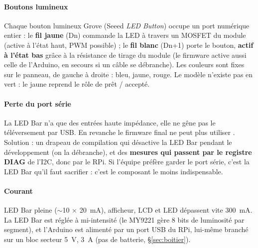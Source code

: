 \documentclass[11pt,a4paper]{article}
\newcommand{\code}[1]{\texttt{\detokenize{#1}}}
\newcommand{\env}{\mbox{$\sim$}}
\begin{document}
\paragraph{Boutons lumineux} Chaque bouton lumineux Grove (Seeed \emph{LED Button}) occupe un port numérique entier : le \textbf{fil jaune} (Dn) commande la LED à travers un MOSFET du module (active à l'état haut, PWM possible) ; le \textbf{fil blanc} (Dn+1) porte le bouton, \textbf{actif à l'état bas} grâce à la résistance de tirage du module (le firmware active aussi celle de l'Arduino, en secours si un câble se débranche). Les couleurs sont fixes sur le panneau, de gauche à droite : bleu, jaune, rouge. Le modèle n'existe pas en vert : le jaune reprend le rôle de \og prêt / accepté\fg{}.

\paragraph{Perte du port série} La LED Bar n'a que des entrées haute impédance, elle ne gêne pas le téléversement par USB. En revanche le firmware final ne peut plus utiliser \code{Serial}. Solution : un drapeau de compilation \code{DEBUG_SERIAL} qui désactive la LED Bar pendant le développement (on la débranche), et des \textbf{mesures qui passent par le registre DIAG} de l'I2C, donc par le RPi. Si l'équipe préfère garder le port série, c'est la LED Bar qu'il faut sacrifier : c'est le composant le moins indispensable.

\paragraph{Courant} LED Bar pleine (\env 10 × 20~mA), afficheur, LCD et LED dépassent vite 300~mA. La LED Bar est réglée à mi-intensité (le MY9221 gère 8 bits de luminosité par segment), et l'Arduino est alimenté par un port USB du RPi, lui-même branché sur un bloc secteur 5~V, 3~A (pas de batterie, \S\ref{sec:boitier}).
\end{document}

